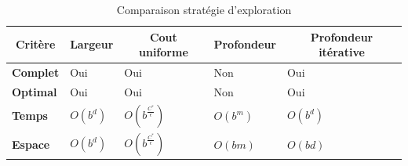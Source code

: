 \begin{table}[H]
    \caption{Comparaison stratégie d'exploration}\label{tab:searchcomp}
    \begin{center}
        \begin{tabular}[c]{|l||l|l|l|l|}
            \hline
            \multicolumn{1}{|c|}{\textbf{Critère}} & 
            \multicolumn{1}{|c|}{\textbf{Largeur}} &
            \multicolumn{1}{c|}{\textbf{Cout uniforme}} &
            \multicolumn{1}{c|}{\textbf{Profondeur}} &
            \multicolumn{1}{c|}{\textbf{Profondeur itérative}} \\

            \hline
            \textbf{Complet}& Oui & Oui & Non & Oui \\ 
            \hline
            \textbf{Optimal}& Oui & Oui & Non & Oui\\ 
            \hline
            \textbf{Temps}& $O(b^d)$ & $O(b^{\frac{C^*}{\epsilon}})$ & $O(b^m)$ & $O(b^d)$\\ 
            \hline
            \textbf{Espace}& $O(b^d)$ & $O(b^{\frac{C^*}{\epsilon}})$ & $O(bm)$ & $O(bd)$\\

            \hline
        \end{tabular}
    \end{center}
\end{table}
